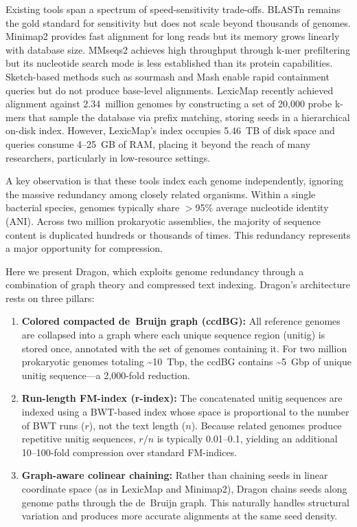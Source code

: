 \documentclass[11pt]{article}
\begin{document}
Existing tools span a spectrum of speed-sensitivity trade-offs. BLASTn \citep{altschul1990blast} remains the gold standard for sensitivity but does not scale beyond thousands of genomes. Minimap2 \citep{li2018minimap2} provides fast alignment for long reads but its memory grows linearly with database size. MMseqs2 \citep{steinegger2017mmseqs2} achieves high throughput through k-mer prefiltering but its nucleotide search mode is less established than its protein capabilities. Sketch-based methods such as sourmash \citep{pierce2019sourmash} and Mash \citep{ondov2016mash} enable rapid containment queries but do not produce base-level alignments. LexicMap \citep{shen2025lexicmap} recently achieved alignment against 2.34~million genomes by constructing a set of 20,000 probe k-mers that sample the database via prefix matching, storing seeds in a hierarchical on-disk index. However, LexicMap's index occupies 5.46~TB of disk space and queries consume 4--25~GB of RAM, placing it beyond the reach of many researchers, particularly in low-resource settings.

A key observation is that these tools index each genome independently, ignoring the massive redundancy among closely related organisms. Within a single bacterial species, genomes typically share $>$95\% average nucleotide identity (ANI). Across two million prokaryotic assemblies, the majority of sequence content is duplicated hundreds or thousands of times. This redundancy represents a major opportunity for compression.

Here we present Dragon, which exploits genome redundancy through a combination of graph theory and compressed text indexing. Dragon's architecture rests on three pillars:

\begin{enumerate}
    \item \textbf{Colored compacted de~Bruijn graph (ccdBG):} All reference genomes are collapsed into a graph where each unique sequence region (unitig) is stored once, annotated with the set of genomes containing it. For two million prokaryotic genomes totaling \textasciitilde10~Tbp, the ccdBG contains \textasciitilde5~Gbp of unique unitig sequence---a 2,000-fold reduction.

    \item \textbf{Run-length FM-index (r-index):} The concatenated unitig sequences are indexed using a BWT-based index whose space is proportional to the number of BWT runs ($r$), not the text length ($n$). Because related genomes produce repetitive unitig sequences, $r/n$ is typically 0.01--0.1, yielding an additional 10--100-fold compression over standard FM-indices.

    \item \textbf{Graph-aware colinear chaining:} Rather than chaining seeds in linear coordinate space (as in LexicMap and Minimap2), Dragon chains seeds along genome paths through the de~Bruijn graph. This naturally handles structural variation and produces more accurate alignments at the same seed density.
\end{enumerate}
\end{document}
